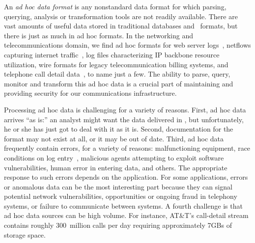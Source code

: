
An {\em ad hoc data format} is any nonstandard data format
for which parsing, querying, analysis or transformation
tools are not readily available.
There are vast amounts of useful data 
stored in traditional databases and \xml\ formats, but there is just
as much in ad hoc formats.
In the networking and telecommunications
domain, we find ad hoc formats for web server logs~\cite{wpp}, 
netflows capturing internet traffic~\cite{netflow}, 
log files characterizing IP backbone resource utilization,
wire formats for legacy telecommunication billing systems, 
and telephone call detail data~\cite{hancock-toplas}, to name just a few.
The ability to parse, query, monitor and transform this ad hoc data
is a crucial part of maintaining and providing security for
our communications infrastructure.

Processing ad hoc data is challenging for a variety of
reasons. First, ad hoc data arrives ``as is:'' an analyst might want the
data delivered in \xml, but unfortunately, he or she has just got to deal
with it as it is.
Second, documentation for the format may not exist at all, or it may be
out of date.  
Third, ad hoc data frequently contain errors, for a variety of
reasons: malfunctioning equipment, race conditions on log
entry~\cite{wpp}, malicious agents attempting to exploit
software vulnerabilities, human error in entering data, and others. 
The appropriate response to such errors depends on the application. 
For some applications, errors or anomalous data can be the most 
interesting part because they can signal potential network
vulnerabilities, opportunities or ongoing fraud in telephony systems, 
or failure to communicate between systems.  A fourth challenge is that 
ad hoc data sources can be high volume.  For instance,
AT\&T's call-detail stream contains roughly 300~million calls per day
requiring approximately 7GBs of storage space.

